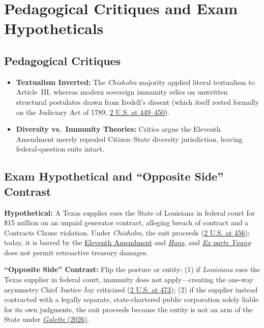 \documentclass[12pt]{article}
\begin{document}
\section{Pedagogical Critiques and Exam Hypotheticals}

\subsection{Pedagogical Critiques}
\begin{itemize}
  \item \textbf{Textualism Inverted:} The \emph{Chisholm} majority applied literal textualism to Article~III, whereas modern sovereign immunity relies on unwritten structural postulates drawn from Iredell's dissent (which itself rested formally on the Judiciary Act of 1789, \href{https://supreme.justia.com/cases/federal/us/2/419/}{2 U.S. at 449--450}).
  \item \textbf{Diversity vs.\ Immunity Theories:} Critics argue the Eleventh Amendment merely repealed Citizen--State diversity jurisdiction, leaving federal-question suits intact.
\end{itemize}

\subsection{Exam Hypothetical and ``Opposite Side'' Contrast}
\textbf{Hypothetical:} A Texas supplier sues the State of Louisiana in federal court for \$15 million on an unpaid generator contract, alleging breach of contract and a Contracts Clause violation. Under \emph{Chisholm}, the suit proceeds (\href{https://supreme.justia.com/cases/federal/us/2/419/}{2 U.S. at 456}); today, it is barred by the \href{https://www.law.cornell.edu/constitution-conan/amendment-11/historical-background-on-eleventh-amendment}{Eleventh Amendment} and \href{https://supreme.justia.com/cases/federal/us/134/1/}{\emph{Hans}}, and \href{https://supreme.justia.com/cases/federal/us/209/123/}{\emph{Ex parte Young}} does not permit retroactive treasury damages.

\textbf{``Opposite Side'' Contrast:} Flip the posture or entity: (1) if \emph{Louisiana} sues the Texas supplier in federal court, immunity does not apply---creating the one-way asymmetry Chief Justice Jay criticized (\href{https://supreme.justia.com/cases/federal/us/2/419/}{2 U.S. at 473}); (2) if the supplier instead contracted with a legally separate, state-chartered public corporation solely liable for its own judgments, the suit proceeds because the entity is not an arm of the State under \href{https://supreme.justia.com/cases/federal/us/607/24-1021/}{\emph{Galette} (2026)}.
\end{document}
